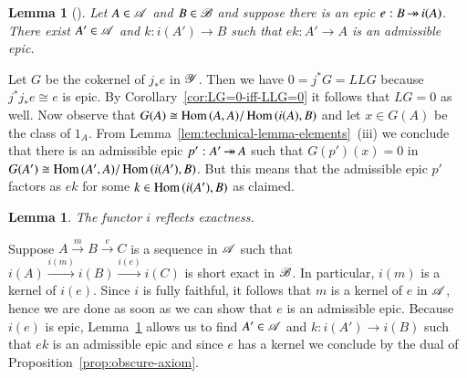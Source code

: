\documentclass[1p]{elsarticle}
\makeatletter
\renewenvironment{proof}[1][\proofname]{\par
  \pushQED{\qed}%
  \normalfont \topsep6\p@\@plus6\p@\relax
  \trivlist
  \item[\hskip\labelsep
        \scshape
    #1\@addpunct{.}]\ignorespaces
}{%
  \popQED\endtrivlist\@endpefalse
}
\theoremstyle{mythm}
\newtheorem{Lem}[Thm]{Lemma}
\theoremstyle{mydef}
\makeatother
\begin{document}
\begin{Lem}[{\cite[A.7.15]{MR1106918}}]
  \label{lem:epics-onto-representables-compose-to-adm-epics}
  Let $A \in \operatorname{\mathscr{A}}$ and $B \in \operatorname{\mathscr{B}}$ and suppose there is an epic
  $e: B \operatorname{\twoheadrightarrow} i(A)$. There exist $A' \in \operatorname{\mathscr{A}}$ and $k: i(A') \to B$
  such that $ek: A' \to A$ is an admissible epic.
\end{Lem}

\begin{proof}
  Let $G$ be the cokernel of $j_{\ast}e$ in $\operatorname{\mathscr{Y}}$. 
  Then we have $0 = j^{\ast}G = LLG$ because
  $j^{\ast}j_{\ast}e \cong e$ is
  epic. By Corollary~\ref{cor:LG=0-iff-LLG=0} it follows that $LG = 0$
  as well. Now observe that
  $G(A) \cong \operatorname{Hom}{(A,A)}/\operatorname{Hom}{(i(A), B)}$ and let 
  $x \in G(A)$ be the class of $1_{A}$. From 
  Lemma~\ref{lem:technical-lemma-elements}~(iii) we conclude 
  that there is an
  admissible epic $p':A' \operatorname{\twoheadrightarrow} A$ such that $G(p')(x) = 0$ in 
  $G(A') \cong \operatorname{Hom}{(A',A)} / \operatorname{Hom}{(i(A'),B)}$. But this means that
  the admissible epic $p'$ factors as $ek$ for some $k \in
  \operatorname{Hom}{(i(A'),B)}$ as claimed.
\end{proof}

\begin{Lem}
  \label{lem:embedding-reflects-exactness}
  The functor $i$ reflects exactness.
\end{Lem}

\begin{proof}
  Suppose $A \xrightarrow{m} B \xrightarrow{e} C$ is a sequence in
  $\operatorname{\mathscr{A}}$ such that 
  $i(A) \xrightarrow{i(m)} i(B) \xrightarrow{i(e)} i(C)$
  is short exact in $\operatorname{\mathscr{B}}$. In particular, $i(m)$ is a kernel of
  $i(e)$. Since $i$ is fully faithful, it follows that $m$
  is a kernel of $e$ in $\operatorname{\mathscr{A}}$, hence we are done as soon as we can
  show that $e$ is an admissible epic. Because $i(e)$ is epic, 
  Lemma~\ref{lem:epics-onto-representables-compose-to-adm-epics}
  allows us to find $A' \in \operatorname{\mathscr{A}}$
  and $k: i(A') \to i(B)$ such that $ek$ is an admissible epic and
  since $e$ has a kernel we conclude by the dual of
  Proposition~\ref{prop:obscure-axiom}.
\end{proof}
\end{document}
